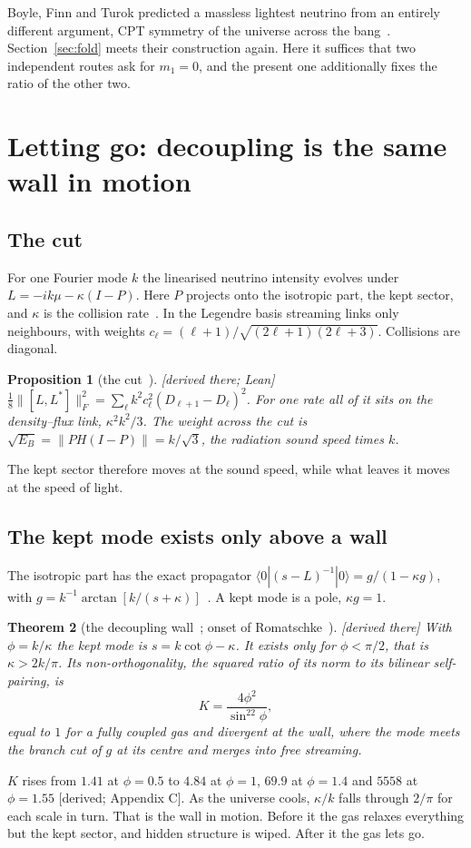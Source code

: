 \documentclass[11pt]{article}
\newtheorem{theorem}{Theorem}\newtheorem{proposition}[theorem]{Proposition}\newtheorem{lemma}[theorem]{Lemma}
\theoremstyle{definition}\newtheorem{hypothesis}{Hypothesis}\newtheorem{prediction}{Prediction}
\theoremstyle{remark}\newtheorem{remark}[theorem]{Remark}
\newcommand{\grade}[1]{\textsf{\small[#1]}}
\begin{document}
Boyle, Finn and Turok predicted a massless lightest neutrino from an entirely different argument, CPT symmetry of the universe across the bang~\cite{BFT,BFT2}. Section~\ref{sec:fold} meets their construction again. Here it suffices that two independent routes ask for $m_1=0$, and the present one additionally fixes the ratio of the other two.

\section{Letting go: decoupling is the same wall in motion}\label{sec:letgo}

\subsection{The cut}
For one Fourier mode $k$ the linearised neutrino intensity evolves under $L=-ik\mu-\kappa(I-P)$. Here $P$ projects onto the isotropic part, the kept sector, and $\kappa$ is the collision rate~\cite{McC,NU10}. In the Legendre basis streaming links only neighbours, with weights $c_\ell=(\ell+1)/\sqrt{(2\ell+1)(2\ell+3)}$. Collisions are diagonal.
\begin{proposition}[the cut~\cite{NU10,CE}]\grade{derived there; Lean}
$\tfrac18\lVert[L,L^*]\rVert_F^2=\sum_\ell k^2c_\ell^2(D_{\ell+1}-D_\ell)^2$. For one rate all of it sits on the density--flux link, $\kappa^2k^2/3$. The weight across the cut is $\sqrt{E_B}=\lVert PH(I-P)\rVert=k/\sqrt3$, the radiation sound speed times $k$.
\end{proposition}
The kept sector therefore moves at the sound speed, while what leaves it moves at the speed of light.

\subsection{The kept mode exists only above a wall}
The isotropic part has the exact propagator $\langle0|(s-L)^{-1}|0\rangle=g/(1-\kappa g)$, with $g=k^{-1}\arctan[k/(s+\kappa)]$~\cite{NU10}. A kept mode is a pole, $\kappa g=1$.
\begin{theorem}[the decoupling wall~\cite{NU10}; onset of Romatschke~\cite{Rom}]\label{thm:onset}\grade{derived there}
With $\phi=k/\kappa$ the kept mode is $s=k\cot\phi-\kappa$. It exists only for $\phi<\pi/2$, that is $\kappa>2k/\pi$. Its non-orthogonality, the squared ratio of its norm to its bilinear self-pairing, is
\begin{equation}
K=\frac{4\phi^2}{\sin^22\phi},
\end{equation}
equal to $1$ for a fully coupled gas and divergent at the wall, where the mode meets the branch cut of $g$ at its centre and merges into free streaming.
\end{theorem}
$K$ rises from $1.41$ at $\phi=0.5$ to $4.84$ at $\phi=1$, $69.9$ at $\phi=1.4$ and $5558$ at $\phi=1.55$ \grade{derived; Appendix C}. As the universe cools, $\kappa/k$ falls through $2/\pi$ for each scale in turn. That is the wall in motion. Before it the gas relaxes everything but the kept sector, and hidden structure is wiped. After it the gas lets go.
\end{document}
